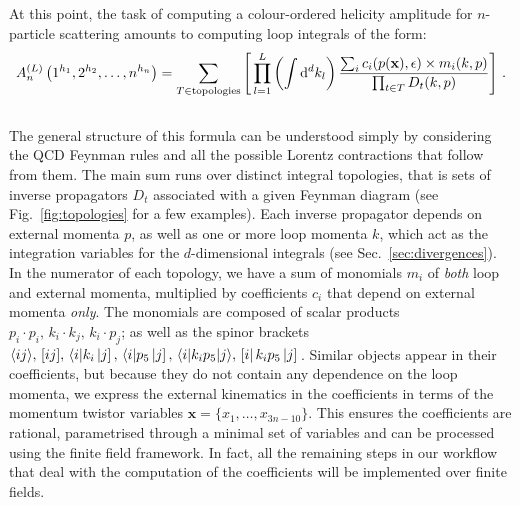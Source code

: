\documentclass[main.tex]{subfiles}
\begin{document}
At this point, the task of computing a colour-ordered helicity amplitude for $n$-particle scattering amounts to computing loop integrals of the form:
\begin{equation} \label{eq:ampschematic}
    	A_n^{(L)} \left(1^{h_1}, 2^{h_2}, \ldots, n^{h_n} \right) =  \sum_{T\in \text{topologies}} \left[\, \prod_{l=1}^{L} \left(\int \mathrm{d}^d k_l \right) \frac{\sum_i c_i(p(\mathbf{x}), \epsilon )\times m_i(k,p)}{\prod_{t\in T} D_t(k,p)} \right]\,.
\end{equation}
\\
The general structure of this formula can be understood simply by considering the QCD Feynman rules and all the possible Lorentz contractions that follow from them. The main sum runs over distinct integral topologies, that is sets of inverse propagators $D_t$ associated with a given Feynman diagram (see Fig.~\ref{fig:topologies} for a few examples). Each inverse propagator depends on external momenta $p$, as well as one or more loop momenta $k$, which act as the integration variables for the $d$-dimensional integrals (see Sec.~\ref{sec:divergences}). In the numerator of each topology, we have a sum of monomials $m_i$ of \textit{both} loop and external momenta, multiplied by coefficients $c_i$ that depend on external momenta \textit{only}. The monomials are composed of scalar products $p_i \cdot p_i,\, k_i \cdot k_j,\, k_i \cdot p_j$; as well as the spinor brackets $\langle ij \rangle,\, [ ij ],\, \langle i |k_i \left| j \right],\, \langle i |p_5 \left| j \right],\, \langle i|k_i p_5|j \rangle,\, \left[ i \right|k_i p_5 \left| j \right]\,$. Similar objects appear in their coefficients, but because they do not contain any dependence on the loop momenta, we express the external kinematics in the coefficients in terms of the momentum twistor variables $\mathbf{x} = \{x_1, \ldots, x_{3n-10}\}$. This ensures the coefficients are rational, parametrised through a minimal set of variables and can be processed using the finite field framework. In fact, all the remaining steps in our workflow that deal with the computation of the coefficients will be implemented over finite fields. 
\end{document}
